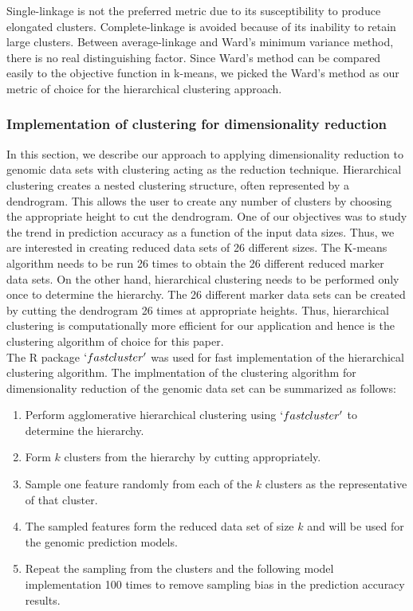 Single-linkage is not the preferred metric due to its susceptibility to produce elongated clusters. Complete-linkage is avoided because of its inability to retain large clusters. Between average-linkage and Ward's minimum variance method, there is no real distinguishing factor. Since Ward's method can be compared easily to the objective function in k-means, we picked the Ward's method as our metric of choice for the hierarchical clustering approach.

\subsubsection{Implementation of clustering for dimensionality reduction}

In this section, we describe our approach to applying dimensionality reduction to genomic data sets with clustering acting as the reduction technique. Hierarchical clustering creates a nested clustering structure, often represented by a dendrogram. This allows the user to create any number of clusters by choosing the appropriate height to cut the dendrogram. One of our objectives was to study the trend in prediction accuracy as a function of the input data sizes. Thus, we are interested in creating reduced data sets of 26 different sizes. The K-means algorithm needs to be run 26 times to obtain the 26 different reduced marker data sets. On the other hand, hierarchical clustering needs to be performed only once to determine the hierarchy. The 26 different marker data sets can be created by cutting the dendrogram 26 times at appropriate heights. Thus, hierarchical clustering is computationally more efficient for our application and hence is the clustering algorithm of choice for this paper. \\

The R package $`fastcluster'$ \cite{mullner_fastcluster_2013} was used for fast implementation of the hierarchical clustering algorithm. The implmentation of the clustering algorithm for dimensionality reduction of the genomic data set can be summarized as follows:

\begin{enumerate}
    \item Perform agglomerative hierarchical clustering using $`fastcluster'$ to determine the hierarchy.
    \item Form $k$ clusters from the hierarchy by cutting appropriately.
    \item Sample one feature randomly from each of the $k$ clusters as the representative of that cluster.
    \item The sampled features form the reduced data set of size $k$ and will be used for the genomic prediction models.
    \item Repeat the sampling from the clusters and the following model implementation 100 times to remove sampling bias in the prediction accuracy results. 
\end{enumerate}

